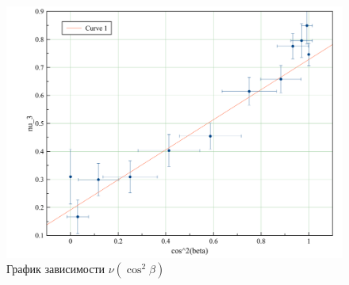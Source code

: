 \documentclass{letask}
\begin{document}
\begin{figure}[H]
\centering
\includegraphics[width = 0.75 \lw]{1.png}
\caption{График зависимости $ \nu({\cos}^2 \beta) $}
\end{figure}
\end{document}
